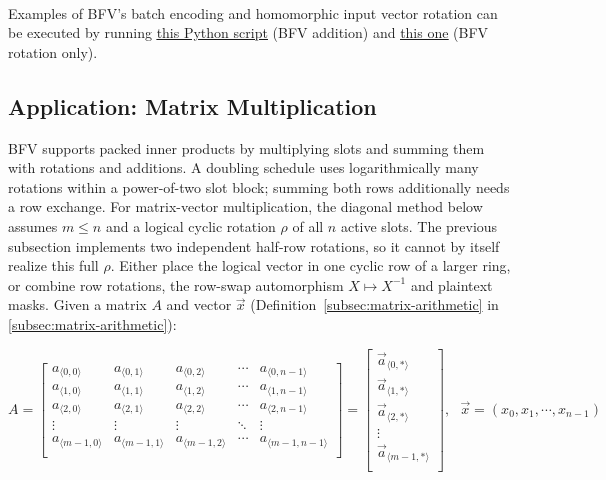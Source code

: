 $ $




 Examples of BFV's batch encoding and homomorphic input vector rotation can be executed by running \href{https://github.com/wang2000star/fhe-textbook-cn/blob/chinese-edition/source%20code/bfv.py}{\underline{this Python script}} (BFV addition) and \href{https://github.com/wang2000star/fhe-textbook-cn/blob/chinese-edition/source%20code/bfv_rotation_only.py}{\underline{this one}} (BFV rotation only).



\subsection{Application: Matrix Multiplication}
\label{subsec:bfv-matrix-multiplication}

BFV supports packed inner products by multiplying slots and summing them with rotations and additions. A doubling schedule uses logarithmically many rotations within a power-of-two slot block; summing both rows additionally needs a row exchange. For matrix-vector multiplication, the diagonal method below assumes $m\leq n$ and a logical cyclic rotation $\rho$ of all $n$ active slots. The previous subsection implements two independent half-row rotations, so it cannot by itself realize this full $\rho$. Either place the logical vector in one cyclic row of a larger ring, or combine row rotations, the row-swap automorphism $X\mapsto X^{-1}$ and plaintext masks. Given a matrix $A$ and vector $\vec x$ (Definition~\ref*{subsec:matrix-arithmetic} in \autoref{subsec:matrix-arithmetic}):

$A = \begin{bmatrix}
 a_{\langle 0, 0\rangle} & a_{\langle 0, 1\rangle} & a_{\langle 0, 2\rangle} & \cdots & a_{\langle 0, n-1\rangle}\\
 a_{\langle 1, 0\rangle} & a_{\langle 1, 1\rangle} & a_{\langle 1, 2\rangle} & \cdots & a_{\langle 1, n-1\rangle} \\
 a_{\langle 2, 0\rangle} & a_{\langle 2, 1\rangle} & a_{\langle 2, 2\rangle} & \cdots & a_{\langle 2, n-1\rangle} \\
\vdots & \vdots & \vdots & \ddots & \vdots \\
 a_{\langle m-1, 0\rangle} & a_{\langle m-1, 1\rangle} & a_{\langle m-1, 2\rangle} & \cdots & a_{\langle m-1, n-1\rangle} \\
\end{bmatrix} = \begin{bmatrix} 
\vec{a}_{\langle 0, * \rangle} \\ 
\vec{a}_{\langle 1, * \rangle} \\ 
\vec{a}_{\langle 2, * \rangle} \\ 
\vdots\\
\vec{a}_{\langle m-1, * \rangle} \\ 
\end{bmatrix}, \text{ } \vec{x} = (x_0, x_1, \cdots, x_{n-1})$

